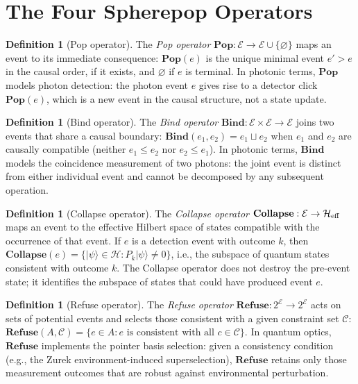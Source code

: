 \documentclass[11pt, openright, twoside]{book}
\theoremstyle{plain}
\theoremstyle{definition}
\newtheorem{definition}[theorem]{Definition}
\theoremstyle{remark}
\newcommand{\Pop}{\mathbf{Pop}}
\newcommand{\Bind}{\mathbf{Bind}}
\newcommand{\Collapse}{\mathbf{Collapse}}
\newcommand{\Refuse}{\mathbf{Refuse}}
\begin{document}
\section{The Four Spherepop Operators}

\begin{definition}[Pop operator]
\label{def:pop}
The \emph{Pop operator} $\Pop: \mathcal{E} \to \mathcal{E} \cup \{\varnothing\}$ maps an
event to its immediate consequence: $\Pop(e)$ is the unique minimal event $e' > e$ in the
causal order, if it exists, and $\varnothing$ if $e$ is terminal. In photonic terms,
$\Pop$ models photon detection: the photon event $e$ gives rise to a detector click $\Pop(e)$,
which is a new event in the causal structure, not a state update.
\end{definition}

\begin{definition}[Bind operator]
\label{def:bind}
The \emph{Bind operator} $\Bind: \mathcal{E} \times \mathcal{E} \to \mathcal{E}$ joins two
events that share a causal boundary: $\Bind(e_1, e_2) = e_1 \sqcup e_2$ when $e_1$ and
$e_2$ are causally compatible (neither $e_1 \leq e_2$ nor $e_2 \leq e_1$). In photonic
terms, $\Bind$ models the coincidence measurement of two photons: the joint event is
distinct from either individual event and cannot be decomposed by any subsequent operation.
\end{definition}

\begin{definition}[Collapse operator]
\label{def:collapse}
The \emph{Collapse operator} $\Collapse: \mathcal{E} \to \mathcal{H}_{\rm eff}$ maps an event
to the effective Hilbert space of states compatible with the occurrence of that event. If
$e$ is a detection event with outcome $k$, then
$\Collapse(e) = \{|\psi\rangle \in \mathcal{H} : P_k|\psi\rangle \neq 0\}$,
i.e., the subspace of quantum states consistent with outcome $k$. The Collapse operator
does not destroy the pre-event state; it identifies the subspace of states that could
have produced event $e$.
\end{definition}

\begin{definition}[Refuse operator]
\label{def:refuse}
The \emph{Refuse operator} $\Refuse: 2^{\mathcal{E}} \to 2^{\mathcal{E}}$ acts on sets
of potential events and selects those consistent with a given constraint set $\mathcal{C}$:
$\Refuse(A, \mathcal{C}) = \{e \in A : e \text{ is consistent with all } c \in \mathcal{C}\}$.
In quantum optics, $\Refuse$ implements the pointer basis selection: given a consistency
condition (e.g., the Zurek environment-induced superselection), $\Refuse$ retains only
those measurement outcomes that are robust against environmental perturbation.
\end{definition}
\end{document}
